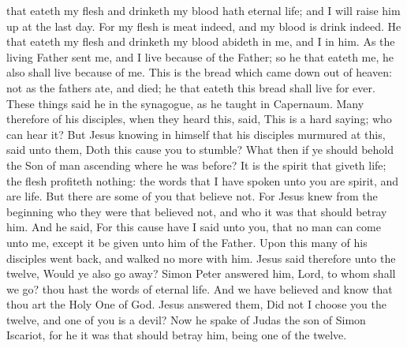 that eateth my flesh and drinketh my blood hath eternal life; and I will raise him up at the last day. For my flesh is meat indeed, and my blood is drink indeed. He that eateth my flesh and drinketh my blood abideth in me, and I in him. As the living Father sent me, and I live because of the Father; so he that eateth me, he also shall live because of me. This is the bread which came down out of heaven: not as the fathers ate, and died; he that eateth this bread shall live for ever. These things said he in the synagogue, as he taught in Capernaum.  Many therefore of his disciples, when they heard this, said, This is a hard saying; who can hear it? But Jesus knowing in himself that his disciples murmured at this, said unto them, Doth this cause you to stumble? What then if ye should behold the Son of man ascending where he was before? It is the spirit that giveth life; the flesh profiteth nothing: the words that I have spoken unto you are spirit, and are life. But there are some of you that believe not. For Jesus knew from the beginning who they were that believed not, and who it was that should betray him. And he said, For this cause have I said unto you, that no man can come unto me, except it be given unto him of the Father.  Upon this many of his disciples went back, and walked no more with him. Jesus said therefore unto the twelve, Would ye also go away? Simon Peter answered him, Lord, to whom shall we go? thou hast the words of eternal life. And we have believed and know that thou art the Holy One of God. Jesus answered them, Did not I choose you the twelve, and one of you is a devil? Now he spake of Judas the son of Simon Iscariot, for he it was that should betray him, being one of the twelve. 



